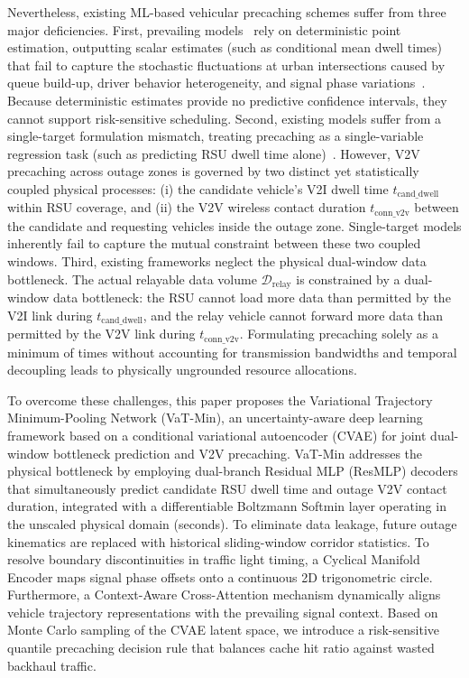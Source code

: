 \documentclass[journal]{IEEEtran}
\begin{document}
Nevertheless, existing ML-based vehicular precaching schemes suffer from three major deficiencies. First, prevailing models~\cite{Wang2025,Feng2023} rely on deterministic point estimation, outputting scalar estimates (such as conditional mean dwell times) that fail to capture the stochastic fluctuations at urban intersections caused by queue build-up, driver behavior heterogeneity, and signal phase variations~\cite{Jiang2023,YZhang2024,CLi2025,Geng2023}. Because deterministic estimates provide no predictive confidence intervals, they cannot support risk-sensitive scheduling. Second, existing models suffer from a single-target formulation mismatch, treating precaching as a single-variable regression task (such as predicting RSU dwell time alone)~\cite{Wang2025,Feng2023}. However, V2V precaching across outage zones is governed by two distinct yet statistically coupled physical processes: (i) the candidate vehicle's V2I dwell time $t_{\text{cand\_dwell}}$ within RSU coverage, and (ii) the V2V wireless contact duration $t_{\text{conn\_v2v}}$ between the candidate and requesting vehicles inside the outage zone. Single-target models inherently fail to capture the mutual constraint between these two coupled windows. Third, existing frameworks neglect the physical dual-window data bottleneck. The actual relayable data volume $\mathcal{D}_{\text{relay}}$ is constrained by a dual-window data bottleneck: the RSU cannot load more data than permitted by the V2I link during $t_{\text{cand\_dwell}}$, and the relay vehicle cannot forward more data than permitted by the V2V link during $t_{\text{conn\_v2v}}$. Formulating precaching solely as a minimum of times without accounting for transmission bandwidths and temporal decoupling leads to physically ungrounded resource allocations.

To overcome these challenges, this paper proposes the Variational Trajectory Minimum-Pooling Network (VaT-Min), an uncertainty-aware deep learning framework based on a conditional variational autoencoder (CVAE) for joint dual-window bottleneck prediction and V2V precaching. VaT-Min addresses the physical bottleneck by employing dual-branch Residual MLP (ResMLP) decoders that simultaneously predict candidate RSU dwell time and outage V2V contact duration, integrated with a differentiable Boltzmann Softmin layer operating in the unscaled physical domain (seconds). To eliminate data leakage, future outage kinematics are replaced with historical sliding-window corridor statistics. To resolve boundary discontinuities in traffic light timing, a Cyclical Manifold Encoder maps signal phase offsets onto a continuous 2D trigonometric circle. Furthermore, a Context-Aware Cross-Attention mechanism dynamically aligns vehicle trajectory representations with the prevailing signal context. Based on Monte Carlo sampling of the CVAE latent space, we introduce a risk-sensitive quantile precaching decision rule that balances cache hit ratio against wasted backhaul traffic.
\end{document}
